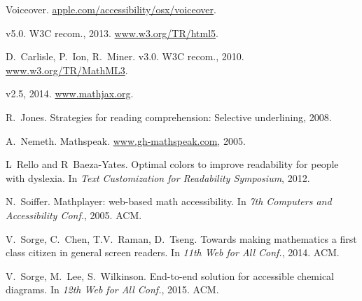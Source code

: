 \documentclass{sig-alternate}
\begin{document}
\begin{thebibliography}{1}\small

Voiceover.
\newblock \url{apple.com/accessibility/osx/voiceover}.

 v5.0.
\newblock W3C recom., 2013.
\newblock \url{www.w3.org/TR/html5}.

D.~Carlisle, P.~Ion, R.~Miner.
 v3.0.
\newblock W3C recom., 2010.
\newblock \url{www.w3.org/TR/MathML3}.

 v2.5, 2014.
\newblock \url{www.mathjax.org}.

R.~Jones.
\newblock Strategies for reading comprehension: Selective underlining, 2008.

A.~Nemeth.
\newblock Mathspeak.
\newblock \url{www.gh-mathspeak.com}, 2005.

L~Rello and R~Baeza-Yates.
\newblock Optimal colors to improve readability for people with dyslexia.
\newblock In {\em Text Customization for Readability Symposium}, 2012.

N.~Soiffer.
\newblock Mathplayer: web-based math accessibility.
\newblock In {\em 7th Computers and Accessibility Conf.}, 2005. ACM.

V.~Sorge, C.~Chen, T.V.~Raman, D.~Tseng.
\newblock Towards making mathematics a first class citizen in general screen
  readers.
\newblock In {\em 11th Web for All Conf.}, 2014. ACM.

V.~Sorge, M.~Lee, S.~Wilkinson.
\newblock End-to-end solution for accessible chemical diagrams.
\newblock In {\em 12th Web for All Conf.}, 2015. ACM.

\end{thebibliography}
\end{document}
